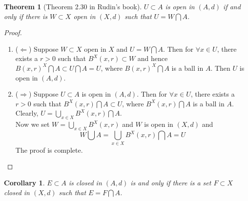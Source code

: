 \documentclass[12pt,leqno]{amsart}
\newtheorem{theorem}{Theorem}[section]
\newtheorem{corollary}{Corollary}[theorem]
\theoremstyle{definition}
\numberwithin{equation}{subsection}
\begin{document}
\begin{theorem}[Theorem 2.30 in Rudin's book]
$U\subset A$ is open in $(A,d)$ if and only if there is $W \subset X$ open in $(X,d)$ such that $U = W\bigcap A$.
\end{theorem}
\begin{proof}
~\begin{enumerate}
    \item ($\Leftarrow$) Suppose $W\subset X$ open in $X$ and $U = W\bigcap A$. Then for $\forall x\in U$, there exists a $r>0$ such that $B^X(x,r)\subset W$ and hence $B(x,r)^X\bigcap A\subset U\bigcap A = U$, where $B(x,r)^X\bigcap A$ is a ball in $A$. Then $U$ is open in $(A,d)$.
    \item ($\Rightarrow$) Suppose $U\subset A$ is open in $(A,d)$. Then for $\forall x\in U$, there exists a $r>0$ such that $B^X(x,r)\bigcap A\subset U$, where $B^X(x,r)\bigcap A$ is a ball in $A$. Clearly, $U = \bigcup_{x\in X}B^X(x,r)\bigcap A$.\\
    Now we set $W = \bigcup_{x\in X}B^X(x,r)$ and $W$ is open in $(X,d)$ and $$W\bigcup A = \bigcup_{x\in X}B^X(x,r)\bigcap A = U$$
    The proof is complete.
\end{enumerate}

\end{proof}

\begin{corollary}
$E\subset A$ is closed in $(A,d)$ is and only if there is a set $F\subset X$ closed in $(X,d)$ such that $E = F\bigcap A$.
\end{corollary}
\end{document}
